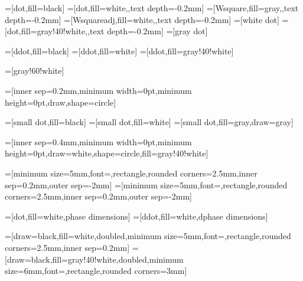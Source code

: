 =[dot,fill=black]
=[dot,fill=white,,text depth=-0.2mm]
=[Wsquare,fill=gray,,text depth=-0.2mm]
=[Wsquareadj,fill=white,,text depth=-0.2mm]
=[white dot] %
=[dot,fill=gray!40!white,,text depth=-0.2mm]
=[gray dot] %


=[ddot,fill=black]
=[ddot,fill=white]
=[ddot,fill=gray!40!white]


=[gray!60!white]


=[inner sep=0.2mm,minimum width=0pt,minimum height=0pt,draw,shape=circle]

=[small dot,fill=black]
=[small dot,fill=white]
=[small dot,fill=gray,draw=gray]

=[inner sep=0.4mm,minimum width=0pt,minimum height=0pt,draw=white,shape=circle,fill=gray!40!white]


=[minimum size=5mm,font=\footnotesize,rectangle,rounded corners=2.5mm,inner sep=0.2mm,outer sep=-2mm]
=[minimum size=5mm,font=\footnotesize,rectangle,rounded corners=2.5mm,inner sep=0.2mm,outer sep=-2mm]

=[dot,fill=white,phase dimensions]
=[ddot,fill=white,dphase dimensions]

=[draw=black,fill=white,doubled,minimum size=5mm,font=\footnotesize,rectangle,rounded corners=2.5mm,inner sep=0.2mm]
=[draw=black,fill=gray!40!white,doubled,minimum size=6mm,font=\footnotesize,rectangle,rounded corners=3mm]

